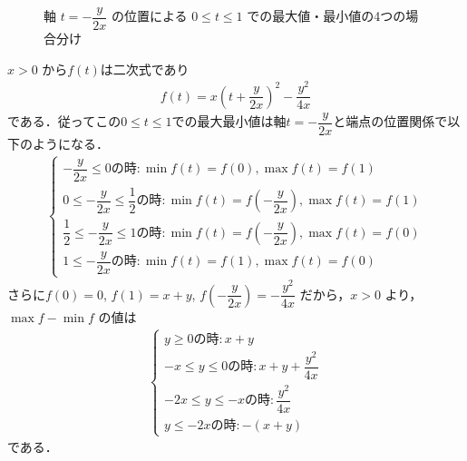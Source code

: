 \documentclass[../../main.tex]{subfiles}
\begin{document}
\begin{figure}[htb]
  \caption{軸 $t = -\dfrac{y}{2x}$ の位置による $0 \le t \le 1$ での最大値・最小値の4つの場合分け}
  \label{fig:four_cases_quadratic_axis}
\end{figure}

$x>0$ から$f(t)$は二次式であり
\begin{align}
  f(t) = x(t + \dfrac{y}{2x})^2 - \dfrac{y^2}{4x}
\end{align}
である．従ってこの$0 \le t \le 1$での最大最小値は軸$t=-\dfrac{y}{2x}$と端点の位置関係で以下のようになる．
\begin{align}
  \begin{cases}
    -\dfrac{y}{2x} \le 0 \text{の時}: \min f(t) = f(0), \max f(t) = f(1) \\
    0 \le -\dfrac{y}{2x} \le \dfrac{1}{2} \text{の時}: \min f(t) = f(-\dfrac{y}{2x}), \max f(t) = f(1) \\
    \dfrac{1}{2} \le -\dfrac{y}{2x} \le 1 \text{の時}: \min f(t) = f(-\dfrac{y}{2x}), \max f(t) = f(0) \\
    1 \le -\dfrac{y}{2x} \text{の時}: \min f(t) = f(1), \max f(t) = f(0)
  \end{cases} \label{eq:1}
\end{align}
さらに$f(0)=0$, $f(1)=x+y$, $f(-\dfrac{y}{2x}) = -\dfrac{y^2}{4x}$ だから，$x>0$ より，$\max f-\min f$ の値は
\begin{align}
  \begin{cases}
    y \ge 0 \text{の時}: x+y \\
    -x \le y \le 0 \text{の時}: x+y + \dfrac{y^2}{4x} \\
    -2x \le y \le -x \text{の時}: \dfrac{y^2}{4x} \\
    y \le -2x  \text{の時}: -(x+y)
  \end{cases} \label{eq:2}
\end{align}
である．
\end{document}
